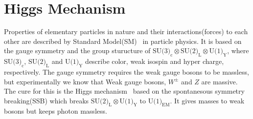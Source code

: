 \section{Higgs Mechanism}

Properties of elementary particles in nature and their interactions(forces)
to each other are described by Standard Model(SM)~\cite{Glashow:1961tr,Weinberg:1967tq,Salam:1963tr} 
in particle physics. It is 
based on the gauge symmetry and the group sturucture of 
$\textrm{SU(3)}_\textrm{c} \otimes \textrm{SU(2)}_\textrm{L} 
\otimes \textrm{U(1)}_\textrm{Y}$, where  $\textrm{SU(3)}_\textrm{c}$, 
$\textrm{SU(2)}_\textrm{L}$ and $\textrm{U(1)}_\textrm{Y}$  
describe color, weak isospin and hyper charge, respectively. 
The gauge symmetry requires the weak gauge bosons to be massless,
but experimentally we know that Weak gauge bosons, $W^\pm$ and $Z$ are massive. 
The cure for this is the Higgs 
mechanism~\cite{Englert:1964et,Higgs:1964ia,Higgs:1964pj,Guralnik:1964eu,Higgs:1966ev, Kibble:1967sv}
based on the spontanesous symmetry breaking(SSB)
which breaks $\textrm{SU(2)}_\textrm{L} \otimes \textrm{U(1)}_\textrm{Y}$
to $\textrm{U(1)}_{\textrm{EM}}$. It gives masses to weak bosons but keeps photon massless. 


